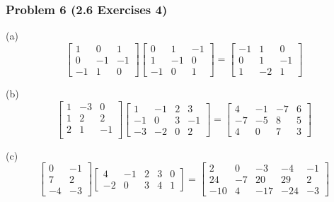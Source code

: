 \documentclass[14pt,hyperref={bookmarks=false}]{beamer}
\begin{document}
	\begin{frame}
	\frametitle{Problem 6 (2.6 Exercises 4)}
	\fontsize{8}{9pt}\selectfont

	(a)
	\begin{equation*}
	\begin{bmatrix}
	    1 &  0 &  1 \\
 	    0 & -1 & -1 \\
 	   -1 &  1 &  0
	\end{bmatrix}
	\begin{bmatrix}
	    0 &  1 & -1 \\
 	    1 & -1 &  0 \\
 	   -1 &  0 &  1
	\end{bmatrix}	
	=
	\begin{bmatrix}
	   -1 &  1 &  0 \\
 	    0 &  1 & -1 \\
 	    1 & -2 &  1
	\end{bmatrix}
	\end{equation*}
	
	(b)
	\begin{equation*}
	\begin{bmatrix}
		1 & -3 & 0 \\
		1 & 2  & 2 \\
		2 & 1  & -1 \\
	\end{bmatrix}
	\begin{bmatrix}
		1 & -1 & 2 & 3\\
		-1 & 0 & 3 & -1\\
		-3 & -2 & 0 & 2
	\end{bmatrix}
	=
	\begin{bmatrix}
		4 & -1 & -7 & 6\\
		-7 & -5 & 8 & 5\\
		4 & 0 & 7 & 3
	\end{bmatrix}
	\end{equation*}

	(c)
	\begin{equation*}
	\begin{bmatrix}
		0 & -1 \\
		7 & 2\\
		-4 & -3
	\end{bmatrix}
	\begin{bmatrix}
	 4 & -1 & 2 & 3 & 0\\
	 -2 & 0 & 3 & 4 & 1
	\end{bmatrix}
	=
	\begin{bmatrix}
		2 & 0 & -3 & -4 & -1\\
		24 & -7 & 20 & 29 & 2\\
		-10 & 4 & -17 & -24 & -3
	\end{bmatrix}
	\end{equation*}
	
	\end{frame}					
\end{document}
